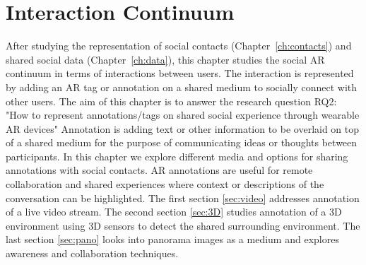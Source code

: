\chapter{Interaction Continuum} %
\label{ch:annotation} %

After studying the representation of social contacts (Chapter~\ref{ch:contacts}) and shared social data (Chapter~\ref{ch:data}), this chapter studies the social AR continuum in terms of interactions between users. The interaction is represented by adding an AR tag or annotation on a shared medium to socially connect with other users. 
The aim of this chapter is to answer the research question RQ2: "How to represent annotations/tags on shared social experience through wearable AR devices"
Annotation is adding text or other information to be overlaid on top of a shared medium for the purpose of communicating ideas or thoughts between participants. In this chapter we explore different media and options for sharing annotations with social contacts. AR annotations are useful for remote collaboration and shared experiences where context or descriptions of the conversation can be highlighted.  
The first section \ref{sec:video} addresses annotation of a live video stream. The second section \ref{sec:3D} studies annotation of a 3D environment using 3D sensors to detect the shared surrounding environment. The last section \ref{sec:pano} looks into panorama images as a medium and explores awareness and collaboration techniques. 





